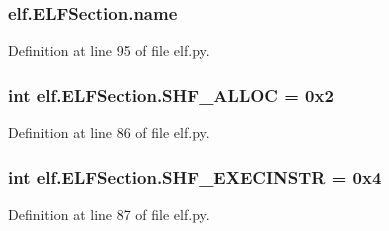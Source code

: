 \subsubsection[{\texorpdfstring{name}{name}}]{\setlength{\rightskip}{0pt plus 5cm}elf.\+E\+L\+F\+Section.\+name}\hypertarget{clasself_1_1_e_l_f_section_a4125dd57752aa571c6502a36e4994501}{}\label{clasself_1_1_e_l_f_section_a4125dd57752aa571c6502a36e4994501}


Definition at line 95 of file elf.\+py.

\subsubsection[{\texorpdfstring{S\+H\+F\+\_\+\+A\+L\+L\+OC}{SHF_ALLOC}}]{\setlength{\rightskip}{0pt plus 5cm}int elf.\+E\+L\+F\+Section.\+S\+H\+F\+\_\+\+A\+L\+L\+OC = 0x2\hspace{0.3cm}{\ttfamily [static]}}\hypertarget{clasself_1_1_e_l_f_section_a8da44d1f4874854616caeb483fc451fd}{}\label{clasself_1_1_e_l_f_section_a8da44d1f4874854616caeb483fc451fd}


Definition at line 86 of file elf.\+py.

\subsubsection[{\texorpdfstring{S\+H\+F\+\_\+\+E\+X\+E\+C\+I\+N\+S\+TR}{SHF_EXECINSTR}}]{\setlength{\rightskip}{0pt plus 5cm}int elf.\+E\+L\+F\+Section.\+S\+H\+F\+\_\+\+E\+X\+E\+C\+I\+N\+S\+TR = 0x4\hspace{0.3cm}{\ttfamily [static]}}\hypertarget{clasself_1_1_e_l_f_section_ac1de96e4eea721ad8b88735a2ce1fdf1}{}\label{clasself_1_1_e_l_f_section_ac1de96e4eea721ad8b88735a2ce1fdf1}


Definition at line 87 of file elf.\+py.


